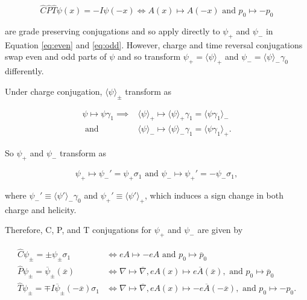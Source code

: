 \documentclass{article}
\begin{document}
  \begin{equation}
    \hat C \hat P \hat T \psi(x) = -I \psi(-x) \iff A(x) \mapsto A(-x) \text{ and } p_0 \mapsto -p_0 \label{eq:cpt}
  \end{equation}

  are grade preserving conjugations and so apply directly to $\psi_+$ and $\psi_-$ in Equation \ref{eq:even} and \ref{eq:odd}. However, charge and time reversal conjugations swap even and odd parts of $\psi$ and so transform $\psi_+ = \langle \psi \rangle_+$ and $\psi_- = \langle \psi \rangle_- \gamma_0$ differently.

  Under charge conjugation, $\langle \psi \rangle_\pm$ transform as

  \begin{align}
    \psi \mapsto \psi \gamma_1 \implies 
    &\langle \psi \rangle_+ \mapsto \langle \psi \rangle_+ \gamma_1 = \langle \psi \gamma_1 \rangle_- \\
    \text{ and } 
    &\langle \psi \rangle_- \mapsto \langle \psi \rangle_- \gamma_1 = \langle \psi \gamma_1 \rangle_+.
  \end{align}

  So $\psi_+$ and $\psi_-$ transform as

  \begin{equation}
    \psi_+ \mapsto \psi_-' = \psi_+ \sigma_1
    \text{ and } 
    \psi_- \mapsto \psi_+' = - \psi_- \sigma_1,
  \end{equation}

  where $\psi_-' \equiv \langle \psi' \rangle_- \gamma_0$ and $\psi_+' \equiv \langle \psi' \rangle_+$, which induces a sign change in both charge and helicity.

  Therefore, C, P, and T conjugations for $\psi_+$ and $\psi_-$ are given by

  \begin{align}
    \hat C \psi_\pm = \pm \psi_\pm \sigma_1 &\iff eA \mapsto - eA \text{ and } p_0 \mapsto \overline p_0 \label{eq:pmcharge}\\
    \hat P \psi_\pm = \overline \psi_\pm(\overline x) &\iff \nabla \mapsto \overline \nabla, eA(x) \mapsto e\overline A(\overline x), \text{ and } p_0 \mapsto \overline p_0 \label{eq:pmparity}\\
    \hat T \psi_\pm = \mp I \overline \psi_\pm(-\overline x) \sigma_1 &\iff \nabla \mapsto \overline\nabla, eA(x) \mapsto -e\overline A(-\overline x), \text{ and } p_0 \mapsto - p_0.\label{eq:pmtime}
  \end{align}
\end{document}
